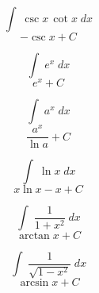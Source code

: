 \documentclass[avery5371,grid]{flashcards}
\begin{document}
\begin{flashcard}{\large \vspace*{\fill} \[ \int\; \csc x \, \cot x \;dx \] \vspace*{\fill}   }{\large \vspace*{\fill} \[ -\csc x + C  \] \vspace*{\fill}   }\end{flashcard}

\begin{flashcard}{\large \vspace*{\fill} \[ \int\; e^x \;dx \] \vspace*{\fill}   }{\large \vspace*{\fill} \[ e^x + C  \] \vspace*{\fill}   }\end{flashcard}

\begin{flashcard}{\large \vspace*{\fill} \[ \int\; a^x \;dx \] \vspace*{\fill}   }{\large \vspace*{\fill} \[ \dfrac{a^x}{\ln a} + C  \] \vspace*{\fill}   }\end{flashcard}

\begin{flashcard}{\large \vspace*{\fill} \[ \int\; \ln x \;dx \] \vspace*{\fill}   }{\large \vspace*{\fill} \[ x\ln x - x + C  \] \vspace*{\fill}   }\end{flashcard}

\begin{flashcard}{\large \vspace*{\fill} \[ \int\; \dfrac{1}{1+x^2} \;dx \] \vspace*{\fill}   }{\large \vspace*{\fill} \[ \arctan x + C   \] \vspace*{\fill}   }\end{flashcard}

\begin{flashcard}{\large \vspace*{\fill} \[ \int\; \dfrac{1}{\sqrt{1-x^2}} \;dx \] \vspace*{\fill}   }{\large \vspace*{\fill} \[ \arcsin x + C   \] \vspace*{\fill}   }\end{flashcard}
\end{document}
